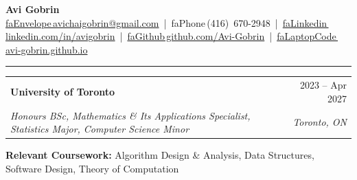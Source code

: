 \documentclass[letterpaper,10pt]{article}
\makeatletter
\newcommand{\I}[1]{\csname fa#1\endcsname\,}%
\newcommand{\Section}[1]{\vspace{4pt}{\large\bfseries #1}\vspace{1pt}\hrule\vspace{3pt}}
\newcommand{\entry}[4]{%
  \vspace{2pt}%
  \begin{tabular*}{\textwidth}{@{}l@{\extracolsep{\fill}}r@{}}
    \textbf{#1} & #2 \\
    \textit{#3} & \textit{#4} \\
  \end{tabular*}\vspace{-4pt}}
\makeatother
\begin{document}
\begin{center}
  {\Huge\bfseries Avi Gobrin}\\[4pt]
  \small
  \mbox{\href{mailto:avichaigobrin@gmail.com}{\I{Envelope}avichaigobrin@gmail.com}} \,|\,
  \mbox{\I{Phone}(416)~670-2948} \,|\,
  \mbox{\href{https://www.linkedin.com/in/avigobrin/}{\I{Linkedin}linkedin.com/in/avigobrin}} \,|\,
  \mbox{\href{https://github.com/Avi-Gobrin}{\I{Github}github.com/Avi-Gobrin}} \,|\,
  \mbox{\href{https://avi-gobrin.github.io/personal-site/}{\I{LaptopCode}avi-gobrin.github.io}}
\end{center}

\Section{Education}
\entry{University of Toronto}{2023 -- Apr 2027}{Honours BSc, Mathematics \& Its Applications Specialist, Statistics Major, Computer Science Minor}{Toronto, ON}
\par\vspace{6pt}\noindent
\textbf{Relevant Coursework:} Algorithm Design \& Analysis, Data Structures, Software Design, Theory of Computation
\end{document}
